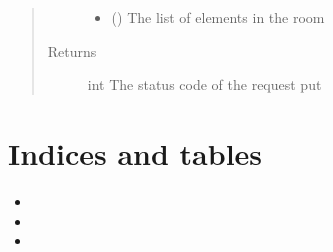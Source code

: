 \documentclass[letterpaper,10pt,english]{sphinxmanual}
\begin{document}
\begin{fulllineitems}
\begin{fulllineitems}
\begin{quote}
\begin{description}
\begin{itemize}
\item {} 
\sphinxAtStartPar
{} () \textendash{} The list of elements in the room

\end{itemize}

\item[{Returns}] \leavevmode
\sphinxAtStartPar
int \textendash{} The status code of the request put

\end{description}\end{quote}

\end{fulllineitems}


\end{fulllineitems}



\chapter{Indices and tables}
\label{\detokenize{index:indices-and-tables}}\begin{itemize}
\item {} 
\sphinxAtStartPar
{}

\item {} 
\sphinxAtStartPar
{}

\item {} 
\sphinxAtStartPar
{}

\end{itemize}


\renewcommand{\indexname}{Python Module Index}
\begin{sphinxtheindex}
\let\bigletter\sphinxstyleindexlettergroup
\bigletter{a}
\item\relax{}
\indexspace
\bigletter{e}
\item\relax{}
\indexspace
\bigletter{h}
\item\relax{}
\indexspace
\bigletter{r}
\item\relax{}
\end{sphinxtheindex}

\renewcommand{\indexname}{Index}
\printindex
\end{document}
